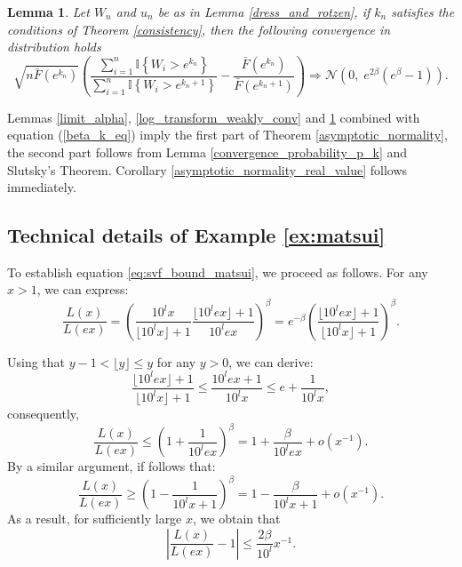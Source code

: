\documentclass[sn-mathphys-ay]{sn-jnl}%
\newtheorem{lemma}{Lemma}[section]
\begin{document}
\begin{appendices}
\begin{lemma}\label{weakly_convergence_ratio} Let \(W_n\) and \(u_n\) be as in Lemma \ref{dress_and_rotzen},
    if \(k_n\) satisfies the conditions of Theorem \ref{consistency}, then the following convergence in distribution holds
    \begin{equation*}
        \sqrt {n\bar F\left( {{e^{{k_n}}}} \right)} \left( {\frac{{\sum\limits_{i = 1}^n {\mathbb{I}\left\{ {{W_i} > {e^{{k_n}}}} \right\}} }}{{\sum\limits_{i = 1}^n {\mathbb{I}\left\{ {{W_i} > {e^{{k_n} + 1}}} \right\}} }} - \frac{{\bar F\left( {{e^{{k_n}}}} \right)}}{{\bar F\left( {{e^{{k_n} + 1}}} \right)}}} \right) \Rightarrow \mathcal{N}\left(0,\; e^{2\beta}(e^{\beta}-1)\right).
    \end{equation*}
\end{lemma}

Lemmas \ref{limit_alpha}, \ref{log_transform_weakly_conv} and
\ref{weakly_convergence_ratio} combined with equation (\ref{beta_k_eq}) imply the
first part of Theorem \ref{asymptotic_normality}, the second part follows from Lemma
\ref{convergence_probability_p_k} and Slutsky's Theorem. Corollary
\ref{asymptotic_normality_real_value} follows immediately.

\subsection{Technical details of Example \ref{ex:matsui}}\label{sec:details_example_matsui}

To establish equation \eqref{eq:svf_bound_matsui}, we proceed as follows. For any
\(x>1\), we can express:
\begin{equation*}
    \frac{L(x)}{L(ex)}=\left( \frac{10^l x}{ \lfloor 10^lx \rfloor + 1 } \frac{ \lfloor 10^l ex \rfloor + 1 }{10^l ex}  \right)^\beta = e^{-\beta}\left( \frac{ \lfloor 10^l ex \rfloor + 1 }{ \lfloor 10^lx \rfloor + 1 } \right)^\beta.
\end{equation*}

Using that \(y-1 < \lfloor y \rfloor \leq y\) for any \(y>0\), we can derive:
\begin{equation*}
    \frac{ \lfloor 10^l ex \rfloor + 1 }{ \lfloor 10^lx \rfloor + 1 }\leq \frac{10^l ex + 1}{10^lx}\leq e + \frac{1}{10^l x},
\end{equation*}
consequently,
\begin{equation*}
    \frac{L(x)}{L(ex)}\leq \left(1+\frac{1}{10^lex}\right)^\beta = 1+\frac{\beta}{10^le x} + o(x^{-1}).
\end{equation*}
By a similar argument, if follows that:
\begin{equation*}
    \frac{L(x)}{L(ex)}\geq \left(1-\frac{1}{10^lx+1}\right)^\beta = 1-\frac{\beta}{10^lx+1} + o(x^{-1}).
\end{equation*}
As a result, for sufficiently large \(x\), we obtain that
\begin{equation*}
    \left| \frac{L(x)}{L(ex)}-1 \right|\leq \frac{2\beta}{10^l}x^{-1}.
\end{equation*}


\end{appendices}
\end{document}
